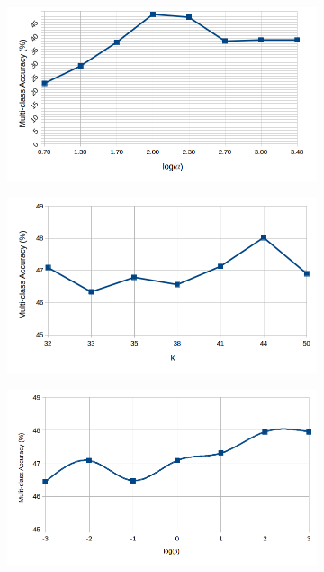  \begin{figure}[!h]
   \captionsetup[subfigure]{labelformat=empty, font=footnotesize}
  \centering
  \begin{subfigure}[b]{0.3\linewidth}
    \includegraphics[width=\linewidth]{images/simple_gamma}
  \end{subfigure}
  \begin{subfigure}[b]{0.3\linewidth}
    \includegraphics[width=\linewidth]{images/simple_k}
  \end{subfigure}
    \begin{subfigure}[b]{0.3\linewidth}
    \includegraphics[width=\linewidth]{images/simple_beta}

\end{subfigure}
\end{figure}
